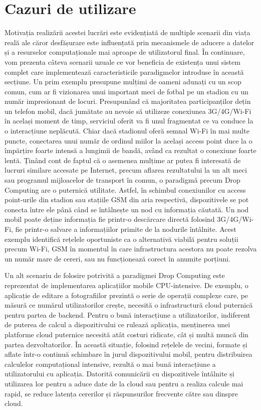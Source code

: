 \documentclass[12pt,a4paper]{report}
\begin{document}
\section{Cazuri de utilizare}
Motivația realizării acestei lucrări este evidențiată de multiple scenarii din viața reală ale căror desfășurare este influențată prin mecanismele de aducere a datelor și a resurselor computaționale mai aproape de utilizatorul final. În continuare, vom prezenta câteva scenarii uzuale ce vor beneficia de existența unui sistem complet care implementează caracteristicile paradigmelor introduse în această secțiune. Un prim exemplu presupune mulțimi de oameni adunați cu un scop comun, cum ar fi vizionarea unui important meci de fotbal pe un stadion cu un număr impresionant de locuri. Presupunând că majoritatea participanților dețin un telefon mobil, dacă jumătate au nevoie să utilizeze conexiunea 3G/4G/Wi-Fi în același moment de timp, serviciul oferit va fi unul fragmentat ce va conduce la o interacțiune neplăcută. Chiar dacă stadionul oferă semnal Wi-Fi în mai multe puncte, conectarea unui număr de ordinul miilor la același access point duce la o împărțire foarte intensă a lungimii de bandă, având ca rezultat o conexiune foarte lentă. Ținând cont de faptul că o asemenea mulțime ar putea fi interesată de lucruri similare accesate pe Internet, precum aflarea rezultatului la un alt meci sau programul mijloacelor de transport în comun, o paradigmă precum Drop Computing are o puternică utilitate. Astfel, în schimbul conexiunilor cu access point-urile din stadion sau stațiile GSM din aria respectivă, dispozitivele se pot conecta între ele până când se întâlnește un nod cu informația căutată. Un nod mobil poate deține informația fie printr-o descărcare directă folosind 3G/4G/Wi-Fi, fie printr-o salvare a informațiilor primite de la nodurile întâlnite. Acest exemplu identifică rețelele oportuniste ca o alternativă viabilă pentru soluții precum Wi-Fi, GSM în momentul în care infrastructura acestora nu poate rezolva un număr mare de cereri, sau nu funcționează corect în anumite porțiuni.

Un alt scenariu de folosire potrivită a paradigmei Drop Computing este reprezentat de implementarea aplicațiilor mobile CPU-intensive. De exemplu, o aplicație de editare a fotografiilor prezintă o serie de operații complexe care, pe măsură ce numărul utilizatorilor crește, necesită o infrastructură cloud puternică pentru partea de backend. Pentru o bună interacțiune a utilizatorilor, indiferent de puterea de calcul a dispozitivului ce rulează aplicația, menținerea unei platforme cloud puternice necesită atât costuri ridicate, cât și multă muncă din partea dezvoltatorilor. În această situație, folosind rețelele de vecini, formate și aflate într-o continuă schimbare în jurul dispozitivului mobil, pentru distribuirea calculelor computațional intensive, rezultă o mai bună interacțiune a utilizatorului cu aplicația. Datorită comunicării cu dispozitivele întâlnite și utilizarea lor pentru a aduce date de la cloud sau pentru a realiza calcule mai rapid, se reduce latența cererilor și răspunsurilor frecvente către sau dinspre cloud.
\end{document}
